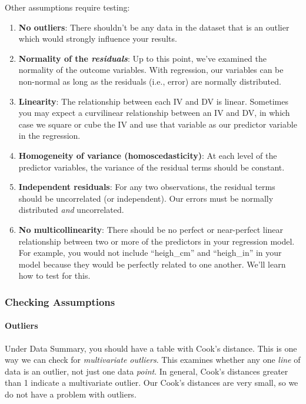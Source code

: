 \documentclass[
]{book}
\begin{document}
Other assumptions require testing:

\begin{enumerate}
\def\labelenumi{\arabic{enumi}.}
\item
  \textbf{No outliers}: There shouldn't be any data in the dataset that is an outlier which would strongly influence your results.
\item
  \textbf{Normality of the \emph{residuals}}: Up to this point, we've examined the normality of the outcome variables. With regression, our variables can be non-normal as long as the residuals (i.e., error) are normally distributed.
\item
  \textbf{Linearity}: The relationship between each IV and DV is linear. Sometimes you may expect a curvilinear relationship between an IV and DV, in which case we square or cube the IV and use that variable as our predictor variable in the regression.
\item
  \textbf{Homogeneity of variance (homoscedasticity)}: At each level of the predictor variables, the variance of the residual terms should be constant.
\item
  \textbf{Independent residuals}: For any two observations, the residual terms should be uncorrelated (or independent). Our errors must be normally distributed \emph{and} uncorrelated.
\item
  \textbf{No multicollinearity}: There should be no perfect or near-perfect linear relationship between two or more of the predictors in your regression model. For example, you would not include ``heigh\_cm'' and ``heigh\_in'' in your model because they would be perfectly related to one another. We'll learn how to test for this.
\end{enumerate}

\hypertarget{checking-assumptions-7}{%
\subsubsection{Checking Assumptions}\label{checking-assumptions-7}}

\hypertarget{outliers}{%
\paragraph{Outliers}\label{outliers}}

Under Data Summary, you should have a table with Cook's distance. This is one way we can check for \emph{multivariate outliers}. This examines whether any one \emph{line} of data is an outlier, not just one data \emph{point}. In general, Cook's distances greater than 1 indicate a multivariate outlier. Our Cook's distances are very small, so we do not have a problem with outliers.
\end{document}
